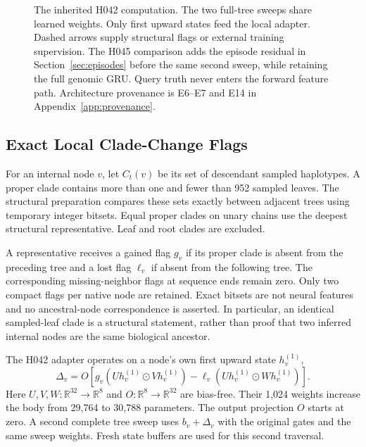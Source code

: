 \documentclass[letterpaper]{article}
\begin{document}
\begin{figure}[t]
\caption{The inherited H042 computation. The two full-tree sweeps share learned weights. Only first upward states feed the local adapter. Dashed arrows supply structural flags or external training supervision. The H045 comparison adds the episode residual in Section~\ref{sec:episodes} before the same second sweep, while retaining the full genomic GRU. Query truth never enters the forward feature path. Architecture provenance is E6--E7 and E14 in Appendix~\ref{app:provenance}.}
\label{fig:architecture}
\end{figure}

\subsection{Exact Local Clade-Change Flags}
For an internal node $v$, let $C_t(v)$ be its set of descendant sampled haplotypes. A proper clade contains more than one and fewer than 952 sampled leaves. The structural preparation compares these sets exactly between adjacent trees using temporary integer bitsets. Equal proper clades on unary chains use the deepest structural representative. Leaf and root clades are excluded.

A representative receives a gained flag $g_v$ if its proper clade is absent from the preceding tree and a lost flag $\ell_v$ if absent from the following tree. The corresponding missing-neighbor flags at sequence ends remain zero. Only two compact flags per native node are retained. Exact bitsets are not neural features and no ancestral-node correspondence is asserted. In particular, an identical sampled-leaf clade is a structural statement, rather than proof that two inferred internal nodes are the same biological ancestor.

The H042 adapter operates on a node's own first upward state $h_v^{(1)}$,
\begin{equation}
\Delta_v=O\!\left[
g_v(Uh_v^{(1)}\odot Vh_v^{(1)})
-\ell_v(Uh_v^{(1)}\odot Wh_v^{(1)})\right].
\label{eq:local}
\end{equation}
Here $U,V,W:\mathbb{R}^{32}\to\mathbb{R}^{8}$ and
$O:\mathbb{R}^{8}\to\mathbb{R}^{32}$ are bias-free. Their 1,024 weights increase the body from 29,764 to 30,788 parameters. The output projection $O$ starts at zero. A second complete tree sweep uses $b_v+\Delta_v$ with the original gates and the same sweep weights. Fresh state buffers are used for this second traversal.
\end{document}
